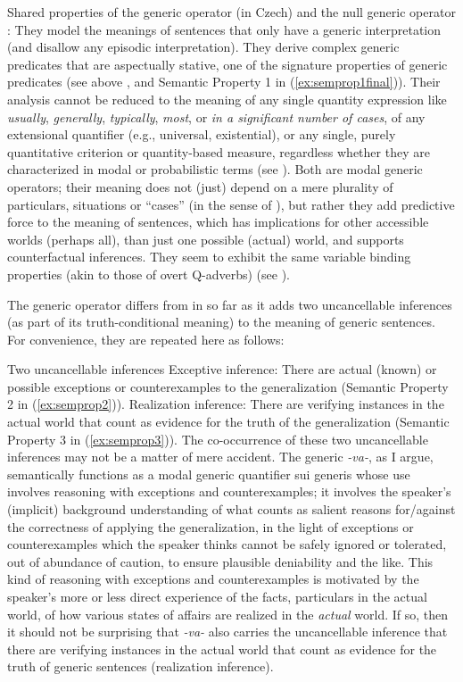 \documentclass[output=paper,colorlinks,citecolor=brown]{langscibook}
\begin{document}
\eanoraggedright
Shared properties of
the generic operator  (in Czech) and the null generic operator :
\eanoraggedright They model the meanings of sentences that only have a generic interpretation (and disallow any episodic interpretation).
\ex They derive complex generic predicates
that are aspectually stative, one of the signature properties of generic predicates (see above , and Semantic Property 1 in (\ref{ex:semprop1final})).
\ex Their analysis cannot be reduced to the meaning of any single quantity expression like \textit{usually}, \textit{generally}, \textit{typically}, \textit{most}, or \textit{in a significant number of cases}, of any extensional quantifier (e.g., universal, existential), or any single, purely quantitative criterion or quantity-based measure, regardless whether they are characterized in modal or probabilistic terms (see  ).
\ex Both are modal generic operators;
their meaning does not (just) depend on a mere plurality of particulars, situations or ``cases'' (in the sense of \citealt{lewis1975}),
but rather they add predictive force to the meaning
of sentences, which has implications for other accessible worlds (perhaps all), than just one possible (actual) world,
and supports counterfactual inferences.
\ex They seem to exhibit the same variable binding properties (akin to those of overt Q-adverbs) (see ).
\z
\z

\noindent
The generic operator  differs
from  in so far as it adds two uncancellable inferences (as part of its truth-conditional meaning)
to the meaning of generic sentences. For convenience,
they are repeated here as follows:

\eanoraggedright
Two uncancellable  inferences\label{two.inferences}
\eanoraggedright Exceptive inference: There are actual (known)  or possible exceptions or counterexamples to the generalization (Semantic Property 2 in (\ref{ex:semprop2})).
\ex Realization inference: There are verifying instances in the actual world that count as evidence for the truth of the generalization (Semantic Property 3 in (\ref{ex:semprop3})).
\z
\z
\noindent
The co-occurrence of these two uncancellable inferences  may not be a matter of mere accident. The generic \textit{-va-}, as I argue,
semantically functions as a modal generic quantifier sui generis whose use involves reasoning with exceptions and counterexamples; it
involves the speaker's (implicit) background understanding of what counts as salient reasons for/against the correctness of applying the generalization, in the light of exceptions or counterexamples which the speaker thinks cannot be safely ignored or tolerated, out of abundance
of caution, to ensure plausible deniability and the like. This kind of reasoning
with exceptions and counterexamples is motivated by the speaker's more or less direct experience of the facts, particulars in the actual world, of how various states of affairs are realized in the \textit{actual} world.  If so, then it should not be surprising that \textit{-va-} also carries the uncancellable inference that there are verifying instances in the actual world that count as evidence for the truth of generic sentences  (realization inference).
\end{document}
